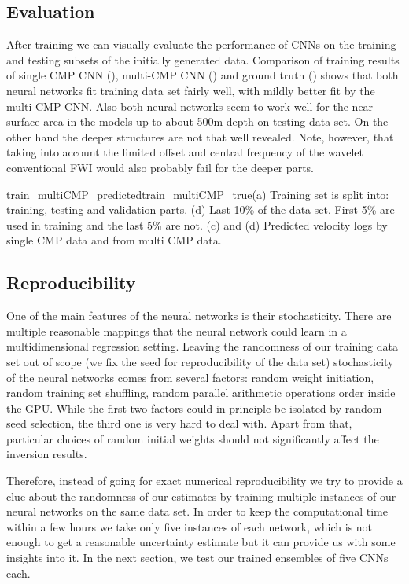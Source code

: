 \documentclass[paper,twocolomn]{geophysics}
\begin{document}

\subsection{Evaluation}
After training we can visually evaluate the performance of CNNs on the training and testing subsets of the initially generated data. Comparison of training results of single CMP CNN (), multi-CMP CNN () and ground truth () shows that both neural networks fit training data set fairly well, with mildly better fit by the multi-CMP CNN. Also both neural networks seem to work well for the near-surface area in the models up to about 500m depth on testing data set. On the other hand the deeper structures are not that well revealed. Note, however, that taking into account the limited offset and central frequency of the wavelet conventional FWI would also probably fail for the deeper parts. %

{train_multiCMP_predicted}{train_multiCMP_true}{(a) Training set is split into: training, testing and validation parts. (d) Last 10\% of the data set. First 5\% are used in training and the last 5\% are not. (c) and (d) Predicted velocity logs by single CMP data and from multi CMP data.}

\subsection{Reproducibility}
One of the main features of the neural networks is their stochasticity. There are multiple reasonable mappings that the neural network could learn in a multidimensional regression setting. Leaving the randomness of our training data set out of scope (we fix the seed for reproducibility of the data set) stochasticity of the neural networks comes from several factors: random weight initiation, random training set shuffling, random parallel arithmetic operations order inside the GPU. While the first two factors could in principle be isolated by random seed selection, the third one is very hard to deal with. Apart from that, particular choices of random initial weights should not significantly affect the inversion results.

Therefore, instead of going for exact numerical reproducibility we try to provide a clue about the randomness of our estimates by training multiple instances of our neural networks on the same data set. In order to keep the computational time within a few hours we take only five instances of each network, which is not enough to get a reasonable uncertainty estimate but it can provide us with some insights into it. In the next section, we test our trained ensembles of five CNNs each.
\end{document}
